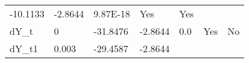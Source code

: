 \documentclass{article}
\begin{document}
\begin{longtable}[c]{@{}lllllll@{}}
\begin{minipage}[t]{0.15\columnwidth}
-10.1133
\strut\end{minipage} &
\begin{minipage}[t]{0.18\columnwidth}\raggedright\strut
-2.8644
\strut\end{minipage} &
\begin{minipage}[t]{0.12\columnwidth}\raggedright\strut
9.87E-18
\strut\end{minipage} &
\begin{minipage}[t]{0.15\columnwidth}\raggedright\strut
Yes
\strut\end{minipage} &
\begin{minipage}[t]{0.10\columnwidth}\raggedright\strut
Yes
\strut\end{minipage}\tabularnewline
\begin{minipage}[t]{0.11\columnwidth}\raggedright\strut
dY\_t
\strut\end{minipage} &
\begin{minipage}[t]{0.09\columnwidth}\raggedright\strut
0
\strut\end{minipage} &
\begin{minipage}[t]{0.15\columnwidth}\raggedright\strut
-31.8476
\strut\end{minipage} &
\begin{minipage}[t]{0.18\columnwidth}\raggedright\strut
-2.8644
\strut\end{minipage} &
\begin{minipage}[t]{0.12\columnwidth}\raggedright\strut
0.0
\strut\end{minipage} &
\begin{minipage}[t]{0.15\columnwidth}\raggedright\strut
Yes
\strut\end{minipage} &
\begin{minipage}[t]{0.10\columnwidth}\raggedright\strut
No
\strut\end{minipage}\tabularnewline
\begin{minipage}[t]{0.11\columnwidth}\raggedright\strut
dY\_t1
\strut\end{minipage} &
\begin{minipage}[t]{0.09\columnwidth}\raggedright\strut
0.003
\strut\end{minipage} &
\begin{minipage}[t]{0.15\columnwidth}\raggedright\strut
-29.4587
\strut\end{minipage} &
\begin{minipage}[t]{0.18\columnwidth}\raggedright\strut
-2.8644
\strut\end{minipage} &
\begin{minipage}[t]{0.12\columnwidth}\raggedright\strut

\end{minipage}
\end{longtable}
\end{document}
